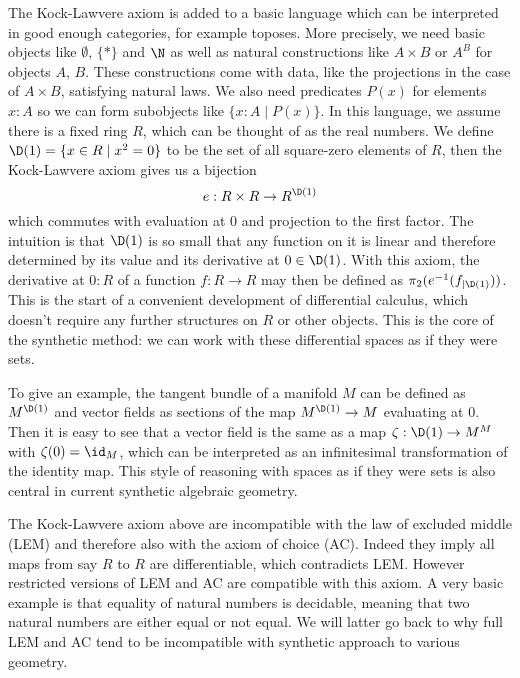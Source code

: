 The Kock-Lawvere axiom is added to a basic language which can be interpreted in good enough categories, for example toposes. More precisely, we need basic objects like $\emptyset$, $\{\ast\}$ and $\N$ as well as natural constructions like $A\times B$ or $A^B$ for objects $A$, $B$. These constructions come with data, like the projections in the case of $A\times B$, satisfying natural laws. We also need predicates $P(x)$ for elements $x:A$ so we can form subobjects like $\{x:A\mid P(x)\}$.
In this language, we assume there is a fixed ring $R$, which can be thought of as the real numbers. We define $\D(1)=\{x\in R\mid x^2=0\}$ to be the set of all square-zero elements of $R$, then the Kock-Lawvere axiom gives us a bijection
\[ e : R \times R  \to R^{\D(1)} \]
which commutes with evaluation at $0$ and projection to the first factor.
The intuition is that $\D(1)$ is so small that any function on it is linear and therefore determined by its value and its derivative at $0\in\D(1)$.
With this axiom, the derivative at $0:R$ of a function $f : R \to R$ may then be defined as $\pi_2(e^{-1}(f_{\vert \D(1)}))$. This is the start of a convenient development of differential calculus, which doesn't require any further structures on $R$ or other objects. This is the core of the synthetic method: we can work with these differential spaces as if they were sets.

To give an example, the tangent bundle of a manifold $M$ can be defined as $M^{\D(1)}$ and vector fields as sections of the map $M^{\D(1)}\to M$ evaluating at $0$. Then it is easy to see that a vector field is the same as a map $\zeta:\D(1)\to M^M$ with $\zeta(0)=\id_M$, which can be interpreted as an infinitesimal transformation of the identity map. This style of reasoning with spaces as if they were sets is also central in current synthetic algebraic geometry. 

The Kock-Lawvere axiom above are incompatible with the law of excluded middle (LEM) and therefore also with the axiom of choice (AC). Indeed they imply all maps from say $R$ to $R$ are differentiable, which contradicts LEM. 
However restricted versions of LEM and AC are compatible with this axiom. A very basic example is that equality of natural numbers is decidable, meaning that two natural numbers are either equal or not equal. We will latter go back to why full LEM and AC tend to be incompatible with synthetic approach to various geometry.


